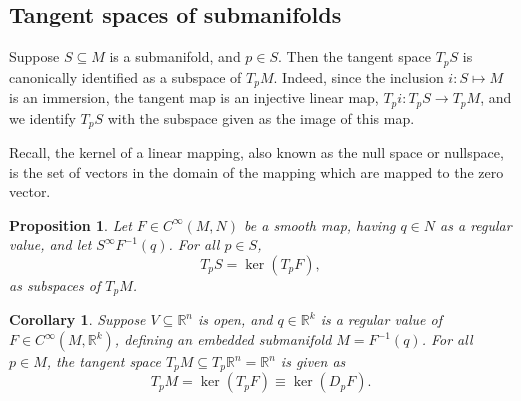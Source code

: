 \documentclass{article}
\newtheorem{corollary}{Corollary}[theorem]
\newtheorem{proposition}{Proposition}[theorem]
\theoremstyle{definition}
\begin{document}
\subsection{Tangent spaces of submanifolds}

Suppose $S \subseteq M$ is a submanifold, and $p \in S$. Then the tangent space $T_pS$ is canonically identified as a subspace of $T_pM$. 
Indeed, since the inclusion $i : S \mapsto M$ is an immersion, the tangent map is an injective linear map, $T_pi : T_pS \rightarrow T_pM$, and we identify $T_pS$ with the subspace given as the image of this map.

Recall, the kernel of a linear mapping, also known as the null space or nullspace, is the set of vectors in the domain of the mapping which are mapped to the zero vector.

\begin{proposition}

Let $F \in C ^{\infty}(M,N)$ be a smooth map, having $q \in N$ as a regular value, and let $S^\infty F^{-1} (q)$. For all $p \in S$,
\[
    T_pS = \ker(T_pF),
\]
as subspaces of $T_pM$.

\end{proposition}

\begin{corollary}

Suppose $V \subseteq \mathbb R^n$ is open, and $q \in \mathbb R^k$ is a regular value of $F \in C^\infty(M, \mathbb R^k)$, defining an embedded submanifold $M = F^{-1} (q)$. For all $p \in M$, the tangent space $T_pM \subseteq T_p \mathbb R^n = \mathbb R^n$ is given as 
\[
    T_p M = \ker(T_pF) \equiv \ker(D_pF).
\]
\end{corollary}
\end{document}
